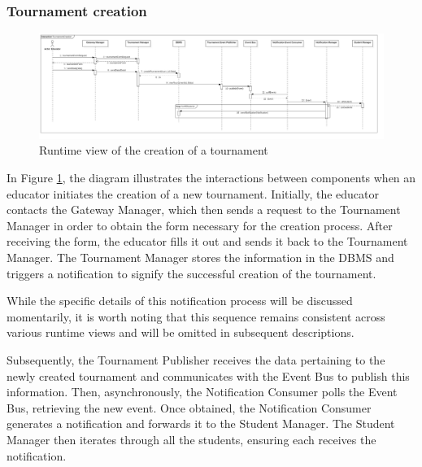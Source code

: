 \subsubsection*{Tournament creation}
\begin{figure}[h!]
    \centering
    \includegraphics[width=1.3\linewidth, angle=90]{2.ArchitecturalDesign/res/TournamentCreation.jpg}
    \caption{Runtime view of the creation of a tournament}
    \label{fig:tournament_creation}
\end{figure}

In Figure \ref{fig:tournament_creation}, the diagram illustrates the interactions between components when an educator initiates the creation of a new tournament. Initially, the educator contacts the Gateway Manager, which then sends a request to the Tournament Manager in order to obtain the form necessary for the creation process. After receiving the form, the educator fills it out and sends it back to the Tournament Manager. The Tournament Manager stores the information in the DBMS and triggers a notification to signify the successful creation of the tournament. 

While the specific details of this notification process will be discussed momentarily, it is worth noting that this sequence remains consistent across various runtime views and will be omitted in subsequent descriptions.

Subsequently, the Tournament Publisher receives the data pertaining to the newly created tournament and communicates with the Event Bus to publish this information. Then, asynchronously, the Notification Consumer polls the Event Bus, retrieving the new event. Once obtained, the Notification Consumer generates a notification and forwards it to the Student Manager. The Student Manager then iterates through all the students, ensuring each receives the notification.

\newpage

